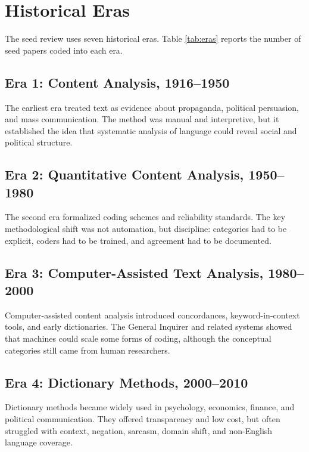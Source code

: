 \documentclass[11pt]{article}
\begin{document}
\section{Historical Eras}

The seed review uses seven historical eras. Table \ref{tab:eras} reports the number of seed papers coded into each era.

\begin{table}[ht]
\centering
\caption{Historical eras in the seed database}
\label{tab:eras}

\end{table}

\subsection{Era 1: Content Analysis, 1916--1950}

The earliest era treated text as evidence about propaganda, political persuasion, and mass communication. The method was manual and interpretive, but it established the idea that systematic analysis of language could reveal social and political structure.

\subsection{Era 2: Quantitative Content Analysis, 1950--1980}

The second era formalized coding schemes and reliability standards. The key methodological shift was not automation, but discipline: categories had to be explicit, coders had to be trained, and agreement had to be documented.

\subsection{Era 3: Computer-Assisted Text Analysis, 1980--2000}

Computer-assisted content analysis introduced concordances, keyword-in-context tools, and early dictionaries. The General Inquirer and related systems showed that machines could scale some forms of coding, although the conceptual categories still came from human researchers.

\subsection{Era 4: Dictionary Methods, 2000--2010}

Dictionary methods became widely used in psychology, economics, finance, and political communication. They offered transparency and low cost, but often struggled with context, negation, sarcasm, domain shift, and non-English language coverage.
\end{document}
